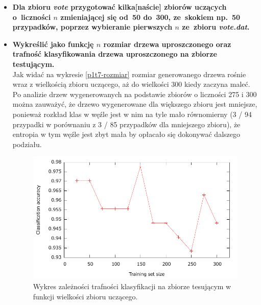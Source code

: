 \begin{itemize}
\item \textbf{Dla zbioru \emph{vote} przygotować kilka[naście] zbiorów uczących o~liczności $n$ zmieniającej się od~50 do~300, ze~skokiem np.~50 przypadków, poprzez wybieranie pierwszych $n$ ze~zbioru \emph{vote.dat}.}

\item \textbf{Wykreślić jako funkcję $n$ rozmiar drzewa uproszczonego oraz trafność klasyfikowania drzewa uproszczonego na zbiorze testującym.}
\\Jak widać na wykresie \ref{p1t7-rozmiar} rozmiar generowanego drzewa rośnie wraz z wielkością zbioru uczącego, aż do wielkości 300 kiedy zaczyna maleć. Po analizie drzew wygenerowanych na podstawie zbiorów o liczności 275 i 300 można zauważyć, że drzewo wygenerowane dla większego zbioru jest mniejsze, ponieważ rozkład klas w węźle jest w nim na tyle mało równomierny (3 / 94 przypadki w porównaniu z 3 / 85 przypadków dla mniejszego zbioru), że entropia w tym węźle jest zbyt mała by opłacało się dokonywać dalszego podziału.
\\

\begin{figure}	
	\includegraphics[scale=0.7]{figures/part1/task7/accuracy.pdf}
	\caption{Wykres zależności trafności klasyfikacji na zbiorze tesującym w funkcji wielkości zbioru uczącego.}
	\label{p1t7-trafnosc}
\end{figure}


\end{itemize}
